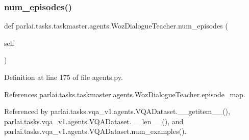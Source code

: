 \mbox{\label{classparlai_1_1tasks_1_1taskmaster_1_1agents_1_1WozDialogueTeacher_a5f8ae65ad372deb60a3ecc5ae2ecb2fa}} 
\subsubsection{\texorpdfstring{num\+\_\+episodes()}{num\_episodes()}}
{\footnotesize\ttfamily def parlai.\+tasks.\+taskmaster.\+agents.\+Woz\+Dialogue\+Teacher.\+num\+\_\+episodes (\begin{DoxyParamCaption}\item[{}]{self }\end{DoxyParamCaption})}



Definition at line 175 of file agents.\+py.



References parlai.\+tasks.\+taskmaster.\+agents.\+Woz\+Dialogue\+Teacher.\+episode\+\_\+map.



Referenced by parlai.\+tasks.\+vqa\+\_\+v1.\+agents.\+V\+Q\+A\+Dataset.\+\_\+\+\_\+getitem\+\_\+\+\_\+(), parlai.\+tasks.\+vqa\+\_\+v1.\+agents.\+V\+Q\+A\+Dataset.\+\_\+\+\_\+len\+\_\+\+\_\+(), and parlai.\+tasks.\+vqa\+\_\+v1.\+agents.\+V\+Q\+A\+Dataset.\+num\+\_\+examples().


